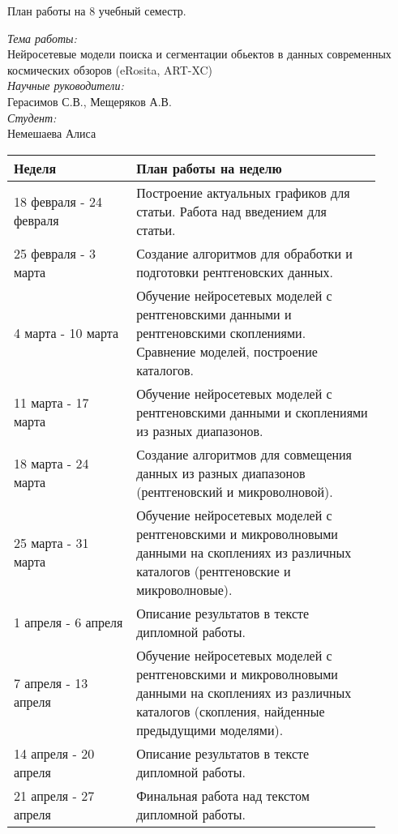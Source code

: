 \documentclass{article}
\begin{document}
\begin{center}
{\huge План работы на 8 учебный семестр.}\\
\end{center}
\textit{Тема работы:}\\
Нейросетевые модели поиска и сегментации обьектов в данных современных космических обзоров (eRosita, ART-XC)\\
\textit{Научные руководители:}\\
Герасимов С.В., Мещеряков А.В.\\
\textit{Студент:}\\
Немешаева Алиса\\
    \begin{table}[h!]
        \begin{tabular}{|p{0.3\linewidth}|p{0.6\linewidth}|}
            \hline
            \textbf{Неделя} & \textbf{План работы на неделю}\\
            \hline
            18 февраля - 24 февраля & Построение актуальных графиков для статьи. Работа над 
                введением для статьи.\\ 
            25 февраля - 3 марта & Создание алгоритмов для обработки и подготовки рентгеновских 
                данных.\\
            \hline
            4 марта - 10 марта & Обучение нейросетевых моделей с рентгеновскими данными и 
                рентгеновскими скоплениями. Сравнение моделей, построение каталогов.\\
            11 марта - 17 марта & Обучение нейросетевых моделей с рентгеновскими данными и 
                скоплениями из разных диапазонов.\\
            18 марта - 24 марта & Создание алгоритмов для совмещения данных из разных диапазонов 
                (рентгеновский и микроволновой).\\
            25 марта - 31 марта & Обучение нейросетевых моделей с рентгеновскими и микроволновыми 
                данными на скоплениях из различных каталогов (рентгеновские и микроволновые).\\
            \hline
            1 апреля - 6 апреля & Описание результатов в тексте дипломной работы.\\
            7 апреля - 13 апреля & Обучение нейросетевых моделей с рентгеновскими и микроволновыми 
                данными на скоплениях из различных каталогов (скопления, найденные предыдущими 
                моделями).\\
            14 апреля - 20 апреля &Описание результатов в тексте дипломной работы.\\
            21 апреля - 27 апреля & Финальная работа над текстом дипломной работы.\\
            \hline
        \end{tabular}
    \end{table}
\end{document}
